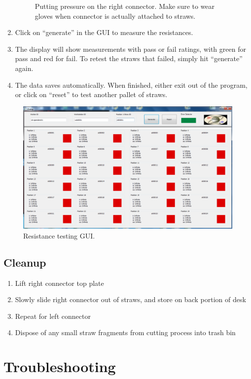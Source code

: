 \documentclass[letterpaper,12pt]{article}
\begin{document}
\begin{enumerate}
\begin{figure}[h]
		\caption{Putting pressure on the right connector. Make sure to wear gloves when connector is actually attached to straws.}
	\end{figure}
	\item Click on ``generate'' in the GUI to measure the resistances.
	\item The display will show measurements with pass or fail ratings, with green for pass and red for fail. To retest the straws that failed, simply hit ``generate'' again.
	\item The data saves automatically. When finished, either exit out of the program, or click on ``reset'' to test another pallet of straws.
\end{enumerate}

\begin{figure}
	\centering
	\includegraphics[width=\textwidth]{gui}
	\caption{Resistance testing GUI.}
	\label{gui}
\end{figure}

\subsection{Cleanup}
\begin{enumerate}
	\item Lift right connector top plate
	\item Slowly slide right connector out of straws, and store on back portion of desk
	\item Repeat for left connector
	\item Dispose of any small straw fragments from cutting process into trash bin
\end{enumerate}

\section{Troubleshooting}
\end{document}

